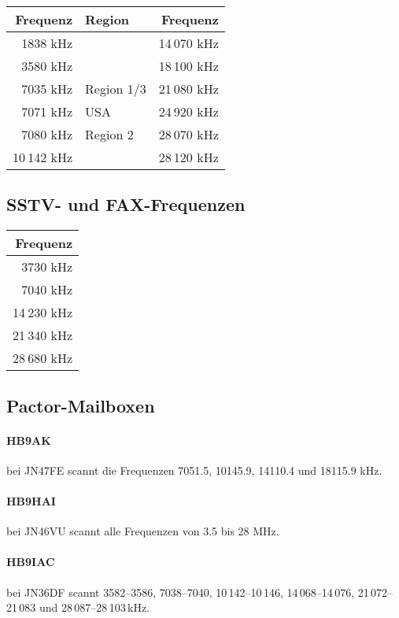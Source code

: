 \vspace{1em}
\noindent
\begin{tabular}{rlr}
\bfseries Frequenz & \bfseries Region & \bfseries Frequenz \\ \toprule \arrayrulecolor{rowsep}
1838 kHz &  & 14 070 kHz \\ \cmidrule{1-1} \cmidrule{3-3}
3580 kHz &  & 18 100 kHz \\ \cmidrule{1-1} \cmidrule{3-3}
7035 kHz & Region 1/3 & 21 080 kHz \\ \cmidrule{1-1} \cmidrule{3-3}
7071 kHz & USA & 24 920 kHz \\ \cmidrule{1-1} \cmidrule{3-3}
7080 kHz & Region 2 & 28 070 kHz \\ \cmidrule{1-1} \cmidrule{3-3}
10 142 kHz &  & 28 120 kHz \\ \cmidrule{1-1} \cmidrule{3-3}
\end{tabular}

\subsection{SSTV- und FAX-Frequenzen}
\noindent
\begin{tabular}{r}
\bfseries Frequenz \\ \toprule \arrayrulecolor{rowsep}
  3730 kHz \\ \midrule
  7040 kHz \\ \midrule
14 230 kHz \\ \midrule
21 340 kHz \\ \midrule
28 680 kHz \\ \midrule
\end{tabular}

\subsection{Pactor-Mailboxen}
\paragraph{HB9AK} bei JN47FE scannt die Frequenzen 7051.5, 10145.9, 14110.4 und 18115.9 kHz.
\paragraph{HB9HAI} bei JN46VU scannt alle Frequenzen von 3.5 bis 28 MHz.
\paragraph{HB9IAC} bei JN36DF scannt 3582--3586, 7038--7040, 10\,142--10\,146, 14\,068--14\,076, 21\,072--21\,083 und 28\,087--28\,103\,kHz.

